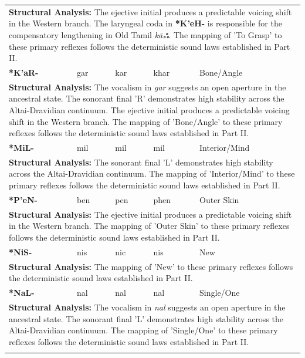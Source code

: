 \begin{longtable}{p{} p{} p{} p{} p{}}
\multicolumn{5}{p{\textwidth}}{\small \textbf{Structural Analysis:} The ejective initial produces a predictable voicing shift in the Western branch. The laryngeal coda in \textbf{*K'eH-} is responsible for the compensatory lengthening in Old Tamil \textit{kāஃ}. The mapping of 'To Grasp' to these primary reflexes follows the deterministic sound laws established in Part II.} \\ \addlinespace[15pt] 
\textbf{*K'aR-} & gar & kar & khar & Bone/Angle \\ 
\multicolumn{5}{p{\textwidth}}{\small \textbf{Structural Analysis:} The vocalism in \textit{gar} suggests an open aperture in the ancestral state. The sonorant final 'R' demonstrates high stability across the Altai-Dravidian continuum. The ejective initial produces a predictable voicing shift in the Western branch. The mapping of 'Bone/Angle' to these primary reflexes follows the deterministic sound laws established in Part II.} \\ \addlinespace[15pt] 
\textbf{*MiL-} & mil & mil & mil & Interior/Mind \\ 
\multicolumn{5}{p{\textwidth}}{\small \textbf{Structural Analysis:} The sonorant final 'L' demonstrates high stability across the Altai-Dravidian continuum. The mapping of 'Interior/Mind' to these primary reflexes follows the deterministic sound laws established in Part II.} \\ \addlinespace[15pt] 
\textbf{*P'eN-} & ben & pen & phen & Outer Skin \\ 
\multicolumn{5}{p{\textwidth}}{\small \textbf{Structural Analysis:} The ejective initial produces a predictable voicing shift in the Western branch. The mapping of 'Outer Skin' to these primary reflexes follows the deterministic sound laws established in Part II.} \\ \addlinespace[15pt] 
\textbf{*NiS-} & nis & nic & nis & New \\ 
\multicolumn{5}{p{\textwidth}}{\small \textbf{Structural Analysis:}  The mapping of 'New' to these primary reflexes follows the deterministic sound laws established in Part II.} \\ \addlinespace[15pt] 
\textbf{*NaL-} & nal & nal & nal & Single/One \\ 
\multicolumn{5}{p{\textwidth}}{\small \textbf{Structural Analysis:} The vocalism in \textit{nal} suggests an open aperture in the ancestral state. The sonorant final 'L' demonstrates high stability across the Altai-Dravidian continuum. The mapping of 'Single/One' to these primary reflexes follows the deterministic sound laws established in Part II.} \\ \addlinespace[15pt] 

\end{longtable}
